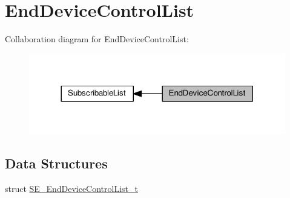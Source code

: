 \hypertarget{group__EndDeviceControlList}{}\section{End\+Device\+Control\+List}
\label{group__EndDeviceControlList}
Collaboration diagram for End\+Device\+Control\+List\+:\nopagebreak
\begin{figure}[H]
\begin{center}
\leavevmode
\includegraphics[width=317pt]{group__EndDeviceControlList}
\end{center}
\end{figure}
\subsection*{Data Structures}
\begin{DoxyCompactItemize}
\item 
struct \hyperlink{structSE__EndDeviceControlList__t}{S\+E\+\_\+\+End\+Device\+Control\+List\+\_\+t}
\end{DoxyCompactItemize}
